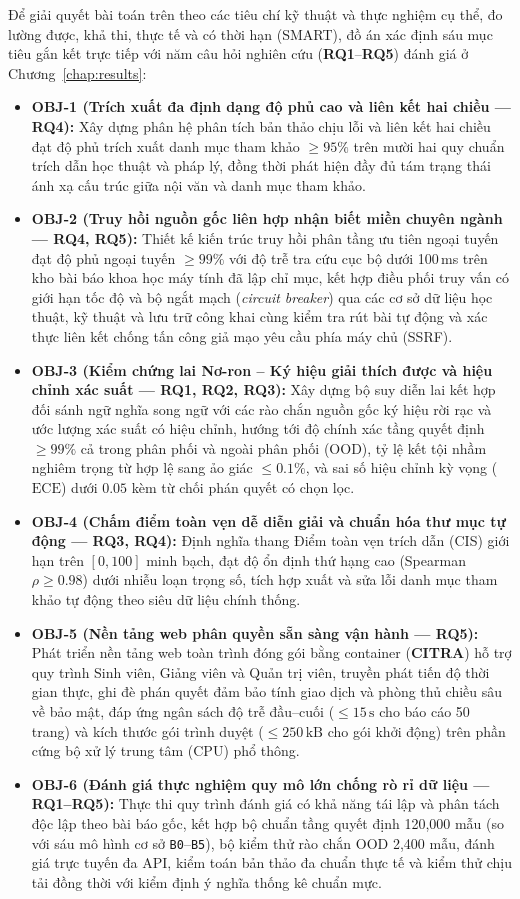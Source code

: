 Để giải quyết bài toán trên theo các tiêu chí kỹ thuật và thực nghiệm cụ thể, đo lường được, khả thi, thực tế và có thời hạn (SMART), đồ án xác định sáu mục tiêu gắn kết trực tiếp với năm câu hỏi nghiên cứu (\textbf{RQ1}--\textbf{RQ5}) đánh giá ở Chương~\ref{chap:results}:
\begin{itemize}
    \item \textbf{OBJ-1 (Trích xuất đa định dạng độ phủ cao và liên kết hai chiều --- RQ4):} Xây dựng phân hệ phân tích bản thảo chịu lỗi và liên kết hai chiều đạt độ phủ trích xuất danh mục tham khảo $\ge 95\%$ trên mười hai quy chuẩn trích dẫn học thuật và pháp lý, đồng thời phát hiện đầy đủ tám trạng thái ánh xạ cấu trúc giữa nội văn và danh mục tham khảo.
    \item \textbf{OBJ-2 (Truy hồi nguồn gốc liên hợp nhận biết miền chuyên ngành --- RQ4, RQ5):} Thiết kế kiến trúc truy hồi phân tầng ưu tiên ngoại tuyến đạt độ phủ ngoại tuyến $\ge 99\%$ với độ trễ tra cứu cục bộ dưới 100\,ms trên kho bài báo khoa học máy tính đã lập chỉ mục, kết hợp điều phối truy vấn có giới hạn tốc độ và bộ ngắt mạch (\textit{circuit breaker}) qua các cơ sở dữ liệu học thuật, kỹ thuật và lưu trữ công khai cùng kiểm tra rút bài tự động và xác thực liên kết chống tấn công giả mạo yêu cầu phía máy chủ (SSRF).
    \item \textbf{OBJ-3 (Kiểm chứng lai Nơ-ron -- Ký hiệu giải thích được và hiệu chỉnh xác suất --- RQ1, RQ2, RQ3):} Xây dựng bộ suy diễn lai kết hợp đối sánh ngữ nghĩa song ngữ với các rào chắn nguồn gốc ký hiệu rời rạc và ước lượng xác suất có hiệu chỉnh, hướng tới độ chính xác tầng quyết định $\ge 99\%$ cả trong phân phối và ngoài phân phối (OOD), tỷ lệ kết tội nhầm nghiêm trọng từ hợp lệ sang ảo giác $\le 0.1\%$, và sai số hiệu chỉnh kỳ vọng ($\text{ECE}$) dưới $0.05$ kèm từ chối phán quyết có chọn lọc.
    \item \textbf{OBJ-4 (Chấm điểm toàn vẹn dễ diễn giải và chuẩn hóa thư mục tự động --- RQ3, RQ4):} Định nghĩa thang Điểm toàn vẹn trích dẫn (CIS) giới hạn trên $[0, 100]$ minh bạch, đạt độ ổn định thứ hạng cao (Spearman $\rho \ge 0.98$) dưới nhiễu loạn trọng số, tích hợp xuất và sửa lỗi danh mục tham khảo tự động theo siêu dữ liệu chính thống.
    \item \textbf{OBJ-5 (Nền tảng web phân quyền sẵn sàng vận hành --- RQ5):} Phát triển nền tảng web toàn trình đóng gói bằng container (\textbf{CITRA}) hỗ trợ quy trình Sinh viên, Giảng viên và Quản trị viên, truyền phát tiến độ thời gian thực, ghi đè phán quyết đảm bảo tính giao dịch và phòng thủ chiều sâu về bảo mật, đáp ứng ngân sách độ trễ đầu--cuối ($\le 15\,\text{s}$ cho báo cáo 50 trang) và kích thước gói trình duyệt ($\le 250\,\text{kB}$ cho gói khởi động) trên phần cứng bộ xử lý trung tâm (CPU) phổ thông.
    \item \textbf{OBJ-6 (Đánh giá thực nghiệm quy mô lớn chống rò rỉ dữ liệu --- RQ1--RQ5):} Thực thi quy trình đánh giá có khả năng tái lập và phân tách độc lập theo bài báo gốc, kết hợp bộ chuẩn tầng quyết định 120,000 mẫu (so với sáu mô hình cơ sở \texttt{B0}--\texttt{B5}), bộ kiểm thử rào chắn OOD 2,400 mẫu, đánh giá trực tuyến đa API, kiểm toán bản thảo đa chuẩn thực tế và kiểm thử chịu tải đồng thời với kiểm định ý nghĩa thống kê chuẩn mực.
\end{itemize}

